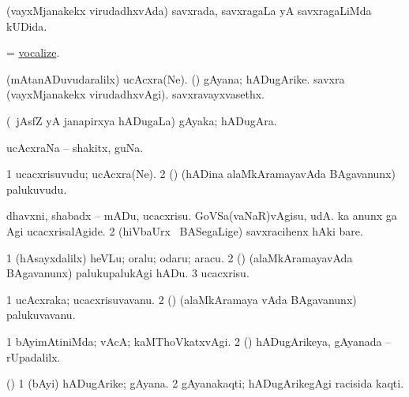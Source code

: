 \bentry 
{} 
\gl{\gu}
\expl{}
\bmng
 (vayxMjanakekx virudadhxvAda) savxrada, savxragaLa yA savxragaLiMda kUDida. 
\emng
\eentry

\bentry
{} 
\gl{\kirx}
\expl{}
\bmng
 = \hyperlink{vocalize}{vocalize}. 
\emng
\eentry

\bentry 
{} 
\gl{\nA}
\expl{}
\bmng
\bnum
{} 
\banum
{} (mAtanADuvudaralilx) ucAcxra(Ne). 
 (\saM) gAyana; hADugArike. 
\eanum
\numie
{} 
\banum
{} savxra (vayxMjanakekx virudadhxvAgi). 
 savxravayxvasethx. 
\eanum
\numie
\enum
\emng
\eentry

\bentry
{} 
\gl{\nA}
\expl{}
\bmng
 (\kanmu\ jAsfZ yA janapirxya hADugaLa) gAyaka; hADugAra. 
\emng
\eentry

\bentry 
{} 
\gl{\nA}
\expl{}
\bmng
 ucAcxraNa -- shakitx, guNa. 
\emng
\eentry

\bentry 
{} 
\gl{\nA}
\expl{}
\bmng
\bnum
\num{1} ucacxrisuvudu; ucAcxra(Ne). 
\num{2} (\saM) (hADina alaMkAramayavAda BAgavanunx) palukuvudu. 
\enum
\emng
\eentry

\bentry
{} 
\gl{\sakirx}
\expl{}
\bmng
\bnum
{} 
\banum
{} dhavxni, shabadx -- mADu, ucacxrisu. 
 GoVSa(vaNaR)vAgisu, udA.  ka anunx ga Agi ucacxrisalAgide. 
\eanum
\numie
\num{2} (hiVbaUrx \mo\ BASegaLige) savxracihenx hAki bare. 
\enum
\emng

\noindent 
\gl{\akirx}
\expl{}
\bmng
\bnum
\num{1} (hAsayxdalilx) heVLu; oralu; odaru; aracu. 
\num{2} (\saM) (alaMkAramayavAda BAgavanunx) palukupalukAgi hADu. 
\num{3} ucacxrisu. 
\enum
\emng
\eentry

\bentry
{} 
\gl{\nA}
\expl{}
\bmng
\bnum
\num{1} ucAcxraka; ucacxrisuvavanu. 
\num{2} (\saM) (alaMkAramaya vAda BAgavanunx) palukuvavanu. 
\enum
\emng
\eentry

\bentry
{} 
\gl{\kirxvi}
\expl{}
\bmng
\bnum
\num{1} bAyimAtiniMda; vAcA; kaMThoVkatxvAgi. 
\num{2} (\saM) hADugArikeya, gAyanada -- rUpadalilx. 
\enum
\emng
\eentry

\bentry
{}
\gl{\nA}
\expl{}
\bmng
 (\saM) 
\bnum
\num{1} (bAyi) hADugArike; gAyana. 
\num{2} gAyanakaqti; hADugArikegAgi racisida kaqti. 
\enum
\emng
\eentry

